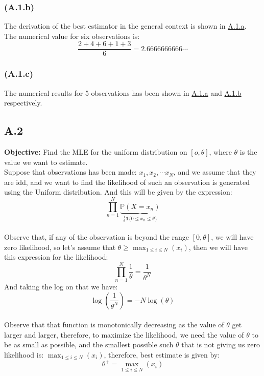 \documentclass[]{article}
\begin{document}
        \subsubsection*{(A.1.b)}\label{A.1.b}
            The derivation of the best estimator in the general context is shown in \hyperref[A.1.a]{A.1.a}. 
            \\[1em]
            The numerical value for six observations is: 
            $$
                \frac{2 + 4 + 6 + 1 + 3}{6} = 2.6666666666\cdots
            $$
        \subsubsection*{(A.1.c)}
            The numerical results for 5 observations has been shown in \hyperref[A.1.a]{A.1.a} and \hyperref[A.1.b]{A.1.b} respectively. 
            
    \subsection*{A.2}
        \textbf{Objective: } Find the MLE for the uniform distribution on $[o, \theta]$, where $\theta$ is the value we want to estimate.
        \\[1em]
        Suppose that observations has been made: $x_1, x_2, \cdots x_N$, and we assume that they are idd, and we want to find the likelihood of such an observation is generated using the Uniform distribution. And this will be given by the expression: 
        \begin{equation*}\tag{A.2.1}\label{eqn:A.2.1}
            \prod_{n = 1}^{N} 
            \underbrace{
            \mathbb{P}\left(X = x_n\right)}_{\frac{1}{\theta}\mathbf{1}\{0 \le x_n \le \theta\}}
        \end{equation*}
        \\[1em]
        Observe that, if any of the observation is beyond the range $[0, \theta]$, we will have zero likelihood, so let's assume that $\theta \ge \max_{1\le i \le N}(x_i)$, then we will have this expression for the likelihood: 
        \begin{equation*}\tag{A.2.2}\label{eqn:A.2.2}
            \prod_{n = 1}^{N} 
            \frac{1}{\theta} = \frac{1}{\theta^N}
        \end{equation*}
        And taking the log on that we have: 
        \begin{equation*}\tag{A.2.3}\label{eqn:A.2.3}
            \log\left(\frac{1}{\theta^N}\right) = -N\log(\theta)
        \end{equation*}
        \\[1em]
        Observe that that function is monotonically decreasing as the value of $\theta$ get larger and larger, therefore, to maximize the likelihood, we need the value of $\theta$ to be as small as possible, and the smallest possible such $\theta$ that is not giving us zero likelihood is: $\max_{1\le i \le N}(x_i)$, therefore, best estimate is given by: 
        $$
            \theta^+ =\max_{1\le i \le N}(x_i)
        $$
\end{document}
